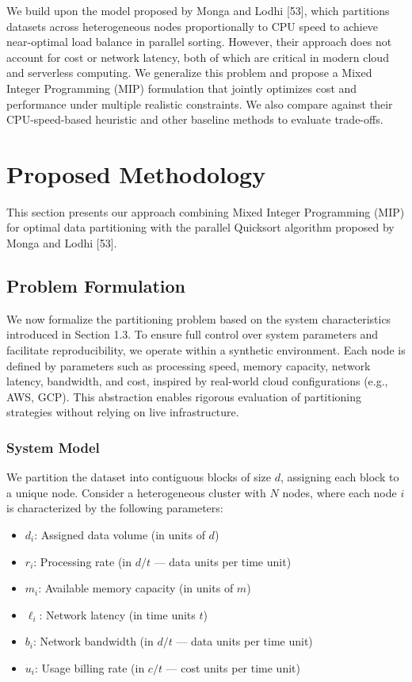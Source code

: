 \documentclass[]{interact}
\theoremstyle{plain}
\theoremstyle{definition}
\theoremstyle{remark}
\begin{document}
We build upon the model proposed by Monga and Lodhi [53], which partitions datasets across heterogeneous nodes proportionally to CPU speed to achieve near-optimal load balance in parallel sorting. However, their approach does not account for cost or network latency, both of which are critical in modern cloud and serverless computing. We generalize this problem and propose a Mixed Integer Programming (MIP) formulation that jointly optimizes cost and performance under multiple realistic constraints. We also compare against their CPU-speed-based heuristic and other baseline methods to evaluate trade-offs.




\section{Proposed Methodology}
\label{sec:methodology}

This section presents our approach combining Mixed Integer Programming (MIP) for optimal data partitioning with the parallel Quicksort algorithm proposed by Monga and Lodhi [53].

\subsection{Problem Formulation}

We now formalize the partitioning problem based on the system characteristics introduced in Section 1.3. To ensure full control over system parameters and facilitate reproducibility, we operate within a synthetic environment. Each node is defined by parameters such as processing speed, memory capacity, network latency, bandwidth, and cost, inspired by real-world cloud configurations (e.g., AWS, GCP). This abstraction enables rigorous evaluation of partitioning strategies without relying on live infrastructure.

\subsubsection{System Model}

We partition the dataset into contiguous blocks of size $d$, assigning each block to a unique node. Consider a heterogeneous cluster with $N$ nodes, where each node $i$ is characterized by the following parameters:

\begin{itemize}
    \item $d_i$: Assigned data volume (in units of $d$)
    \item $r_i$: Processing rate (in $d/t$ — data units per time unit)
    \item $m_i$: Available memory capacity (in units of $m$)
    \item $\ell_i$: Network latency (in time units $t$)
    \item $b_i$: Network bandwidth (in $d/t$ — data units per time unit)
    \item $u_i$: Usage billing rate (in $c/t$ — cost units per time unit)
\end{itemize}
\end{document}
